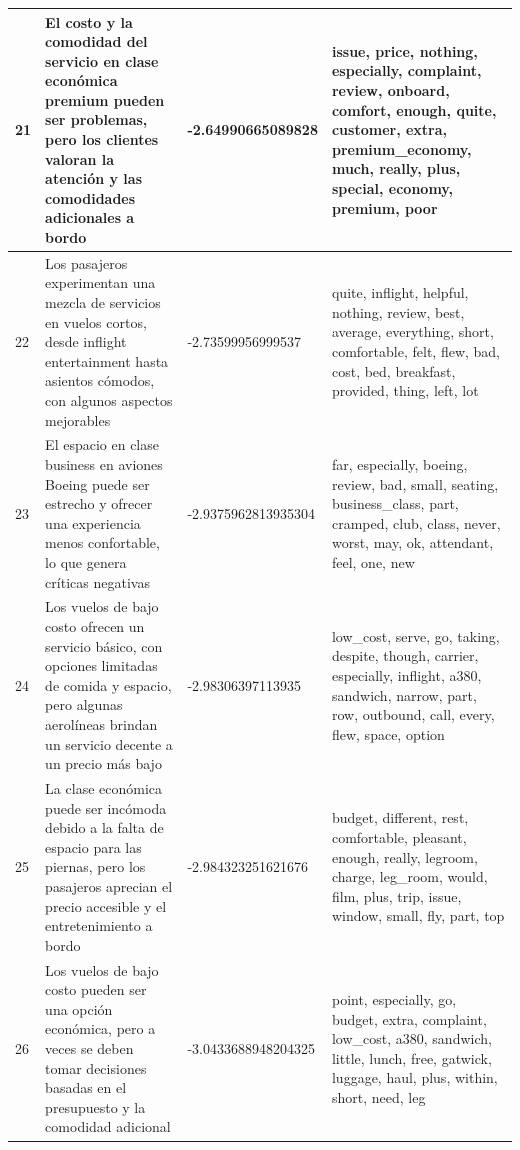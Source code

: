 \documentclass{report}
\begin{document}
{{\begin{longtable}{|p{1cm}|p{4cm}|p{4cm}|p{6cm}|}
                    \hline
                    21 & El costo y la comodidad del servicio en clase económica premium pueden ser problemas, pero los clientes valoran la atención y las comodidades adicionales a bordo & -2.64990665089828 & issue, price, nothing, especially, complaint, review, onboard, comfort, enough, quite, customer, extra, premium\_economy, much, really, plus, special, economy, premium, poor \\
                    \hline
                    22 & Los pasajeros experimentan una mezcla de servicios en vuelos cortos, desde inflight entertainment hasta asientos cómodos, con algunos aspectos mejorables & -2.73599956999537 & quite, inflight, helpful, nothing, review, best, average, everything, short, comfortable, felt, flew, bad, cost, bed, breakfast, provided, thing, left, lot \\
                    \hline
                    23 & El espacio en clase business en aviones Boeing puede ser estrecho y ofrecer una experiencia menos confortable, lo que genera críticas negativas & -2.9375962813935304 & far, especially, boeing, review, bad, small, seating, business\_class, part, cramped, club, class, never, worst, may, ok, attendant, feel, one, new \\
                    \hline
                    24 & Los vuelos de bajo costo ofrecen un servicio básico, con opciones limitadas de comida y espacio, pero algunas aerolíneas brindan un servicio decente a un precio más bajo & -2.98306397113935 & low\_cost, serve, go, taking, despite, though, carrier, especially, inflight, a380, sandwich, narrow, part, row, outbound, call, every, flew, space, option \\
                    \hline
                    25 & La clase económica puede ser incómoda debido a la falta de espacio para las piernas, pero los pasajeros aprecian el precio accesible y el entretenimiento a bordo & -2.984323251621676 & budget, different, rest, comfortable, pleasant, enough, really, legroom, charge, leg\_room, would, film, plus, trip, issue, window, small, fly, part, top \\
                    \hline
                    26 & Los vuelos de bajo costo pueden ser una opción económica, pero a veces se deben tomar decisiones basadas en el presupuesto y la comodidad adicional & -3.0433688948204325 & point, especially, go, budget, extra, complaint, low\_cost, a380, sandwich, little, lunch, free, gatwick, luggage, haul, plus, within, short, need, leg \\
                    \hline

\end{longtable}}}
\end{document}
